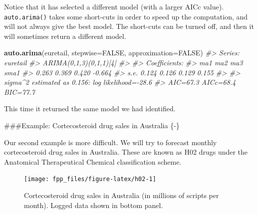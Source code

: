 \documentclass[]{book}
\newenvironment{Shaded}{\begin{snugshade}}{\end{snugshade}}
\newcommand{\CommentTok}[1]{\textcolor[rgb]{0.56,0.35,0.01}{\textit{#1}}}
\newcommand{\DataTypeTok}[1]{\textcolor[rgb]{0.13,0.29,0.53}{#1}}
\newcommand{\KeywordTok}[1]{\textcolor[rgb]{0.13,0.29,0.53}{\textbf{#1}}}
\newcommand{\NormalTok}[1]{#1}
\newcommand{\OperatorTok}[1]{\textcolor[rgb]{0.81,0.36,0.00}{\textbf{#1}}}
\newcommand{\OtherTok}[1]{\textcolor[rgb]{0.56,0.35,0.01}{#1}}
\newcommand{\StringTok}[1]{\textcolor[rgb]{0.31,0.60,0.02}{#1}}
\begin{document}
Notice that it has selected a different model (with a larger AICc value). \texttt{auto.arima()} takes some short-cuts in order to speed up the computation, and will not always give the best model. The short-cuts can be turned off, and then it will sometimes return a different model.

\begin{Shaded}
\begin{Highlighting}[]
\KeywordTok{auto.arima}\NormalTok{(euretail, }\DataTypeTok{stepwise=}\OtherTok{FALSE}\NormalTok{, }\DataTypeTok{approximation=}\OtherTok{FALSE}\NormalTok{)}
\CommentTok{#> Series: euretail }
\CommentTok{#> ARIMA(0,1,3)(0,1,1)[4] }
\CommentTok{#> }
\CommentTok{#> Coefficients:}
\CommentTok{#>         ma1    ma2    ma3    sma1}
\CommentTok{#>       0.263  0.369  0.420  -0.664}
\CommentTok{#> s.e.  0.124  0.126  0.129   0.155}
\CommentTok{#> }
\CommentTok{#> sigma^2 estimated as 0.156:  log likelihood=-28.6}
\CommentTok{#> AIC=67.3   AICc=68.4   BIC=77.7}
\end{Highlighting}
\end{Shaded}

This time it returned the same model we had identified.

\#\#\#Example: Cortecosteroid drug sales in Australia \{-\}

Our second example is more difficult. We will try to forecast monthly cortecosteroid drug sales in Australia. These are known as H02 drugs under the Anatomical Therapeutical Chemical classification scheme.

\begin{Shaded}
\end{Shaded}

\begin{figure}

{\centering \texttt{[image: fpp\_files/figure-latex/h02-1]} 

}

\caption{Cortecosteroid drug sales in Australia (in millions of scripts per month). Logged data shown in bottom panel.}\label{fig:h02}
\end{figure}
\end{document}

